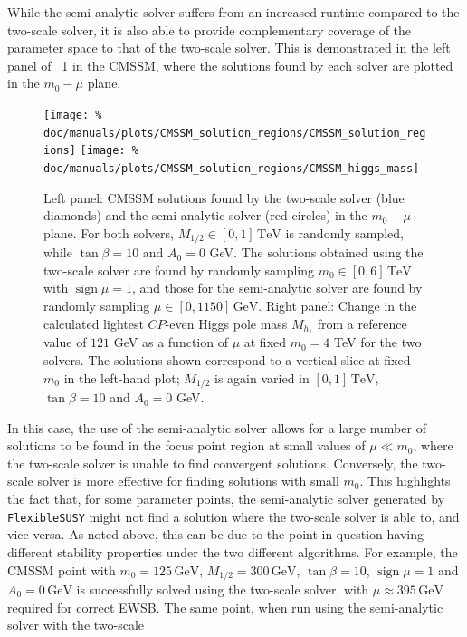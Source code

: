 \documentclass[final,3p,11pt,pdflatex]{elsarticle}
\makeatletter
\newcommand{\fs}{\texttt{FlexibleSUSY}\@\xspace}
\newcommand{\unit}[1]{\,\text{#1}}      %
\newcommand{\figref}[1]{\figurename~\ref{#1}}
\newcommand{\CP}{\ensuremath{CP}\xspace}
\newcommand{\azero}{\ensuremath{A_0}\xspace}
\newcommand{\mhalf}{\ensuremath{M_{1/2}}\xspace}
\newcommand{\mzero}{\ensuremath{m_0}\xspace}
\DeclareMathOperator{\sign}{sign}
\makeatother
\begin{document}
While the semi-analytic solver suffers from an increased runtime compared to
the two-scale solver, it is also able to provide complementary coverage of the
parameter space to that of the two-scale solver.  This is demonstrated in the
left panel of \figref{fig:cmssm_solution_regions} in the CMSSM, where the
solutions found by each solver are plotted in the $\mzero - \mu$ plane.
%
\begin{figure}
  \centering
  \texttt{[image: \%
    doc/manuals/plots/CMSSM\_solution\_regions/CMSSM\_solution\_regions]}
  \texttt{[image: \%
    doc/manuals/plots/CMSSM\_solution\_regions/CMSSM\_higgs\_mass]}
  \caption{Left panel: CMSSM solutions found by the two-scale solver
    (blue diamonds) and the semi-analytic solver (red circles) in the
    $\mzero - \mu$ plane.  For both solvers, $\mhalf \in [0,1]\unit{TeV}$
    is randomly sampled, while $\tan\beta = 10$ and $\azero = 0$ GeV\@.
    The solutions obtained using the two-scale solver are found by
    randomly sampling $\mzero \in [0, 6]\unit{TeV}$ with $\sign \mu = 1$,
    and those for the semi-analytic solver are found by randomly sampling
    $\mu \in [0,1150] \unit{GeV}$.  Right panel: Change in the calculated
    lightest \CP-even Higgs pole mass $M_{h_1}$ from a reference value of
    $121$ GeV as a function of $\mu$ at fixed $\mzero = 4$ TeV for the two
    solvers.  The solutions shown correspond to a vertical slice at fixed
    $\mzero$ in the left-hand plot; $\mhalf$ is again varied in
    $[0,1]\unit{TeV}$, $\tan\beta = 10$ and $\azero = 0$ GeV.}
  \label{fig:cmssm_solution_regions}
\end{figure}
%
In this case, the use of the semi-analytic solver allows for a large number
of solutions to be found in the focus point region \cite{Chan:1997bi,
  Feng:1999hg,Feng:1999mn} at small values of $\mu \ll \mzero$, where the
two-scale solver is unable to find convergent solutions.  Conversely,
the two-scale solver is more effective for finding solutions with small
$\mzero$.  This highlights the fact that, for some parameter points,
the semi-analytic solver generated by \fs might not find a solution
where the two-scale solver is able to, and vice versa.  As noted above, this
can be due to the point in question having different stability properties
under the two different algorithms.  For example, the CMSSM point with
$m_0 = 125\unit{GeV}$, $M_{1/2} = 300\unit{GeV}$, $\tan\beta = 10$,
$\sign \mu = 1$ and $A_0 = 0\unit{GeV}$  is successfully solved using the
two-scale solver, with $\mu \approx 395\unit{GeV}$ required for correct EWSB.
The same point, when run using the semi-analytic solver with the two-scale
\end{document}
